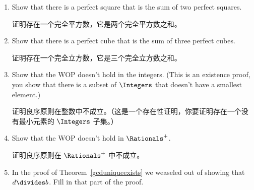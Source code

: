 \begin{enumerate}
    \item Show that there is a perfect square that is the sum of two
    perfect squares.
    
    证明存在一个完全平方数，它是两个完全平方数之和。
    
    
    \wbvfill
    
    \item Show that there is a perfect cube that is the sum of three
    perfect cubes.
    
    证明存在一个完全立方数，它是三个完全立方数之和。
    
    \wbvfill
    
    \workbookpagebreak
    
    \item Show that the WOP doesn't hold in the integers.
    (This is an
    existence proof, you show that there is a subset of $\Integers$
    that doesn't have a smallest element.)
    
    证明良序原则在整数中不成立。（这是一个存在性证明，你要证明存在一个没有最小元素的 $\Integers$ 子集。）
    
    
    \wbvfill
    
    \item Show that the WOP doesn't hold in $\Rationals^+$.
    
    证明良序原则在 $\Rationals^+$ 中不成立。
    
    \wbvfill
    
    \workbookpagebreak
    
    \item In the proof of Theorem~\ref{gcduniqueexists} we weaseled out of
    showing that $d \divides b$.
    Fill in that part of the proof.
    

\end{enumerate}
